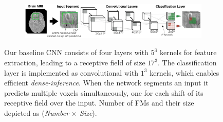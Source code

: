 
\begin{figure}[!h]
\centering
\iftrue
\begin{subfigure}[b]{1.0\textwidth}
\centering
	\includegraphics[clip=true, trim=0pt 0pt 0pt 0pt, width=1.0\textwidth]{figures/methodSection/cnnSystem/baselineDense.png}
\end{subfigure}
\fi
\caption{Our baseline CNN consists of four layers with $5^3$ kernels for feature extraction, leading to a receptive field of size $17^3$. The classification layer is implemented as convolutional with $1^3$ kernels, which enables efficient \textit{dense-inference}. When the network segments an input it predicts multiple voxels simultaneously, one for each shift of its receptive field over the input. Number of FMs and their size depicted as (\textit{Number $\times$ Size}).}
\label{fig:cnnBaseline}
\end{figure}
